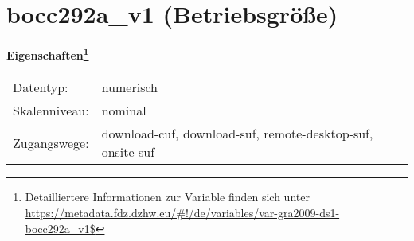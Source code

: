 
    \setcounter{footnote}{0}

    \vspace*{-1.8cm}
	\section{bocc292a\_v1 (Betriebsgröße)}
	\label{section:bocc292a_v1}



    \vspace*{0.5cm}
    \noindent\textbf{Eigenschaften\footnote{Detailliertere Informationen zur Variable finden sich unter
		\url{https://metadata.fdz.dzhw.eu/\#!/de/variables/var-gra2009-ds1-bocc292a_v1$}}}\\
	\begin{tabularx}{\hsize}{@{}lX}
	Datentyp: & numerisch \\
	Skalenniveau: & nominal \\
	Zugangswege: &
	  download-cuf, 
	  download-suf, 
	  remote-desktop-suf, 
	  onsite-suf
 \\
    \end{tabularx}



